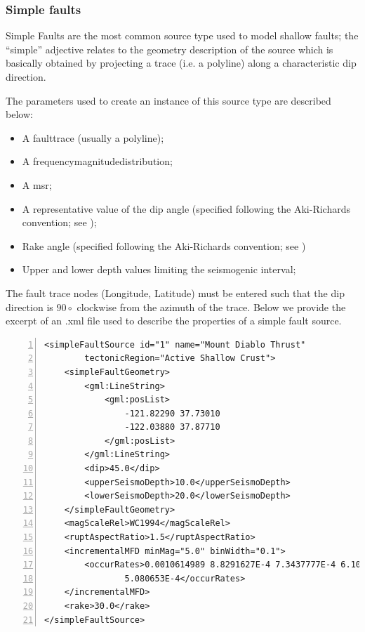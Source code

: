 \subsubsection{Simple faults}
%
Simple Faults are the most common source type used to model shallow 
faults; the ``simple'' adjective relates to the geometry description 
of the source which is basically obtained by projecting a trace 
(i.e. a polyline) along a characteristic dip direction. 

The parameters used to create an instance of this 
source type are described below:
%
%
\begin{itemize}
\item A \gls{faulttrace} (usually a polyline); 
\item A \gls{frequencymagnitudedistribution};
\item A \gls{msr};
\item A representative value of the dip angle (specified following 
the Aki-Richards convention; see \citet{aki2002});
\item Rake angle (specified following the Aki-Richards convention; 
see \citet{aki2002}) 
\item Upper and lower depth values limiting the seismogenic interval; 
\end{itemize}

The fault trace nodes (Longitude, Latitude) must be entered such that the 
dip direction is $90 \circ$ clockwise from the azimuth of the trace.
Below we provide the excerpt of an .xml file used to describe the 
properties of a simple fault source.
\begin{Verbatim}[frame=single, commandchars=\\\{\}, fontsize=\footnotesize,
    numbers=left, numbersep=2pt]
<simpleFaultSource id="1" name="Mount Diablo Thrust" 
		tectonicRegion="Active Shallow Crust">
    <simpleFaultGeometry>
        <gml:LineString>
            <gml:posList>
                -121.82290 37.73010
                -122.03880 37.87710
            </gml:posList>
        </gml:LineString>
        <dip>45.0</dip>
        <upperSeismoDepth>10.0</upperSeismoDepth>
        <lowerSeismoDepth>20.0</lowerSeismoDepth>
    </simpleFaultGeometry>
    <magScaleRel>WC1994</magScaleRel>
    <ruptAspectRatio>1.5</ruptAspectRatio>
    <incrementalMFD minMag="5.0" binWidth="0.1">
        <occurRates>0.0010614989 8.8291627E-4 7.3437777E-4 6.108288E-4 
				5.080653E-4</occurRates>
    </incrementalMFD>
    <rake>30.0</rake>
</simpleFaultSource>
\end{Verbatim}
%
